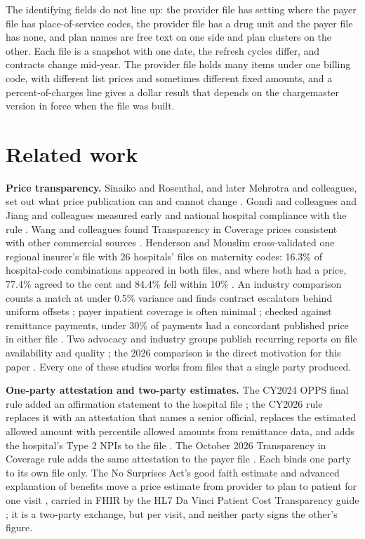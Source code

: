 \documentclass[10pt]{article}
\begin{document}
The identifying fields do not line up: the provider file has setting where the payer file has place-of-service codes, the provider file has a drug unit and the payer file has none, and plan names are free text on one side and plan clusters on the other. Each file is a snapshot with one date, the refresh cycles differ, and contracts change mid-year. The provider file holds many items under one billing code, with different list prices and sometimes different fixed amounts, and a percent-of-charges line gives a dollar result that depends on the chargemaster version in force when the file was built.

\section*{Related work}

\textbf{Price transparency.} Sinaiko and Rosenthal, and later Mehrotra and colleagues, set out what price publication can and cannot change \cite{sinaiko2011,mehrotra2018}. Gondi and colleagues and Jiang and colleagues measured early and national hospital compliance with the rule \cite{gondi2021,jiang2022}. Wang and colleagues found Transparency in Coverage prices consistent with other commercial sources \cite{wang2023}. Henderson and Mouslim cross-validated one regional insurer's file with 26 hospitals' files on maternity codes: 16.3\% of hospital-code combinations appeared in both files, and where both had a price, 77.4\% agreed to the cent and 84.4\% fell within 10\% \cite{henderson2024}. An industry comparison counts a match at under 0.5\% variance and finds contract escalators behind uniform offsets \cite{turquoise2023}; payer inpatient coverage is often minimal \cite{muhlestein2025}; checked against remittance payments, under 30\% of payments had a concordant published price in either file \cite{triana2024}. Two advocacy and industry groups publish recurring reports on file availability and quality \cite{turquoise,pra}; the 2026 comparison is the direct motivation for this paper \cite{trilliant}. Every one of these studies works from files that a single party produced.

\textbf{One-party attestation and two-party estimates.} The CY2024 OPPS final rule added an affirmation statement to the hospital file \cite{opps2024}; the CY2026 rule replaces it with an attestation that names a senior official, replaces the estimated allowed amount with percentile allowed amounts from remittance data, and adds the hospital's Type 2 NPIs to the file \cite{opps2026}. The October 2026 Transparency in Coverage rule adds the same attestation to the payer file \cite{tic2026}. Each binds one party to its own file only. The No Surprises Act's good faith estimate and advanced explanation of benefits move a price estimate from provider to plan to patient for one visit \cite{nsa}, carried in FHIR by the HL7 Da Vinci Patient Cost Transparency guide \cite{pct}; it is a two-party exchange, but per visit, and neither party signs the other's figure.
\end{document}
